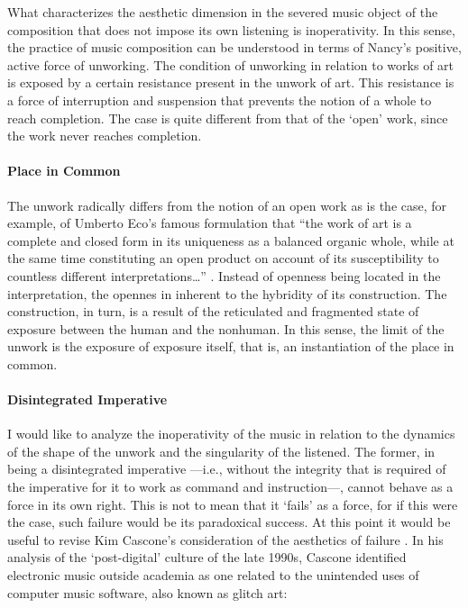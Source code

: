 What characterizes the aesthetic dimension in the severed music object of the composition that does not impose its own listening is inoperativity. In this sense, the practice of music composition can be understood in terms of Nancy's positive, active force of unworking. The condition of unworking in relation to works of art is exposed by a certain resistance present in the unwork of art. This resistance is a force of interruption and suspension that prevents the notion of a whole to reach completion. The case is quite different from that of the `open' work, since the work never reaches completion.

\paragraph{Place in Common}
The unwork radically differs from the notion of an open work as is the case, for example, of Umberto Eco's famous formulation that ``the work of art is a complete and closed form in its uniqueness as a balanced organic whole, while at the same time constituting an open product on account of its susceptibility to countless different interpretations\dots'' \parencite{Eco04:The}. Instead of openness being located in the interpretation, the opennes in inherent to the hybridity of its construction. The construction, in turn, is a result of the reticulated and fragmented state of exposure between the human and the nonhuman. In this sense, the limit of the unwork is the exposure of exposure itself, that is, an instantiation of the place in common.

\paragraph{Disintegrated Imperative}
I would like to analyze the inoperativity of the music in relation to the dynamics of the shape of the unwork and the singularity of the listened. The former, in being a disintegrated imperative ---i.e., without the integrity that is required of the imperative for it to work as command and instruction---, cannot behave as a force in its own right. This is not to mean that it `fails' as a force, for if this were the case, such failure would be its paradoxical success. At this point it would be useful to revise Kim Cascone's consideration of the aesthetics of failure \parencite{Cas00:The}. In his analysis of the `post-digital' culture of the late 1990s, Cascone identified electronic music outside academia as one related to the unintended uses of computer music software, also known as glitch art:

